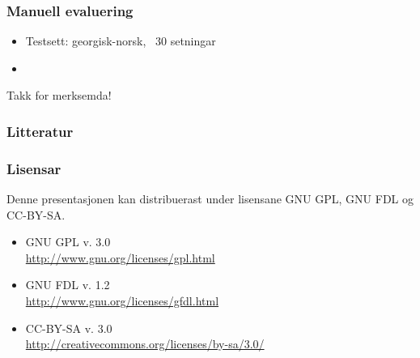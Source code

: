 \documentclass[bigger]{beamer}
\begin{document}
\begin{frame}\frametitle{Manuell evaluering}
  \begin{itemize}
  \item Testsett: georgisk-norsk, ~30 setningar
  \item 
  \end{itemize}
\end{frame}



\begin{frame}
  \begin{center}
    {\huge Takk for merksemda!}
  \end{center}
\end{frame}

\begin{frame}\frametitle{Litteratur}
  \nocite{dyvik2009lmp}
  
  
\end{frame}

\begin{frame}\frametitle{Lisensar}
  Denne presentasjonen kan distribuerast under lisensane
  GNU GPL, GNU FDL og CC-BY-SA.
  \begin{itemize}
  \item GNU GPL v. 3.0 \\
    \href{http://www.gnu.org/licenses/gpl.html}{http://www.gnu.org/licenses/gpl.html}
  \item GNU FDL v. 1.2 \\
    \href{http://www.gnu.org/licenses/gfdl.html}{http://www.gnu.org/licenses/gfdl.html}
  \item CC-BY-SA v. 3.0 \\
    \href{http://creativecommons.org/licenses/by-sa/3.0/}{http://creativecommons.org/licenses/by-sa/3.0/}
  \end{itemize}
\end{frame}
\end{document}
